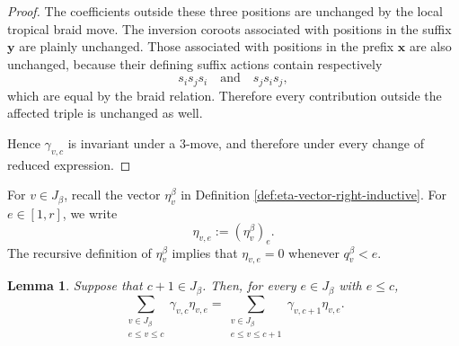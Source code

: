 \documentclass[12pt, reqno]{amsart}
\theoremstyle{plain}
\newtheorem{lemma}[theorem]{Lemma}
\theoremstyle{definition}
\numberwithin{equation}{section}
\begin{document}
\begin{proof}
The coefficients outside these three positions are unchanged by the
local tropical braid move. The inversion coroots associated with
positions in the suffix \(\mathbf y\) are plainly unchanged. Those
associated with positions in the prefix \(\mathbf x\) are also
unchanged, because their defining suffix actions contain respectively
\[
    s_is_js_i
    \quad\text{and}\quad
    s_js_is_j,
\]
which are equal by the braid relation. Therefore every contribution
outside the affected triple is unchanged as well.

Hence \(\gamma_{v,c}\) is invariant under a \(3\)-move, and therefore
under every change of reduced expression.
\end{proof}

For \(v\in J_\beta\), recall the vector 
\(\eta_v^\beta\) in Definition \ref{def:eta-vector-right-inductive}. For \(e\in[1,r]\), we write
\[
 \eta_{v,e}:=(\eta_v^\beta)_e.
\]
The recursive definition of \(\eta_v^\beta\) implies that
\(\eta_{v,e}=0\) whenever \(q_v^\beta<e\).

\begin{lemma}
\label{lem:solid-step-gamma}
Suppose that \(c+1\in J_\beta\). Then, for every \(e\in J_\beta\)
with \(e\leq c\),
\begin{equation}
 \sum_{\substack{v\in J_\beta\\ e\leq v\leq c}}
 \gamma_{v,c}\eta_{v,e}
 =
 \sum_{\substack{v\in J_\beta\\ e\leq v\leq c+1}}
 \gamma_{v,c+1}\eta_{v,e}.
 \label{eq:solid-step-gamma}
\end{equation}
\end{lemma}
\end{document}
